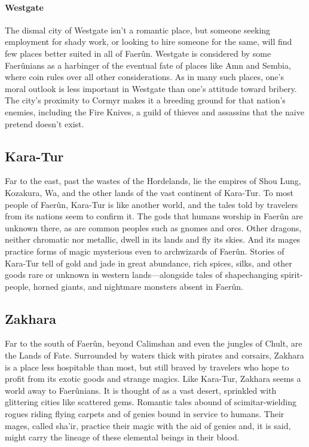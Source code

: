 \documentclass[10pt,a4paper,twoside,twocolumn,openany,bg=print,nodeprecatedcode]{dndbook}
\begin{document}
\paragraph{Westgate}
The dismal city of Westgate isn't a romantic place, but someone seeking employment for shady work, or looking to hire someone for the same, will find few places better suited in all of Faerûn.
Westgate is considered by some Faerûnians as a harbinger of the eventual fate of places like Amn and Sembia, where coin rules over all other considerations. As in many such places, one's moral outlook is less important in Westgate than one's attitude toward bribery. The city's proximity to Cormyr makes it a breeding ground for that nation's enemies, including the Fire Knives, a guild of thieves and assassins that the naive pretend doesn't exist.
\subsection{Kara-Tur}
Far to the east, past the wastes of the Hordelands, lie the empires of Shou Lung, Kozakura, Wa, and the other lands of the vast continent of Kara-Tur. To most people of Faerûn, Kara-Tur is like another world, and the tales told by travelers from its nations seem to confirm it. The gods that humans worship in Faerûn are unknown there, as are common peoples such as gnomes and orcs. Other dragons, neither chromatic nor metallic, dwell in its lands and fly its skies. And its mages practice forms of magic mysterious even to archwizards of Faerûn.
Stories of Kara-Tur tell of gold and jade in great abundance, rich spices, silks, and other goods rare or unknown in western lands—alongside tales of shapechanging spirit-people, horned giants, and nightmare monsters absent in Faerûn.
\subsection{Zakhara}
Far to the south of Faerûn, beyond Calimshan and even the jungles of Chult, are the Lands of Fate. Surrounded by waters thick with pirates and corsairs, Zakhara is a place less hospitable than most, but still braved by travelers who hope to profit from its exotic goods and strange magics. Like Kara-Tur, Zakhara seems a world away to Faerûnians. It is thought of as a vast desert, sprinkled with glittering cities like scattered gems. Romantic tales abound of scimitar-wielding rogues riding flying carpets and of genies bound in service to humans. Their mages, called sha'ir, practice their magic with the aid of genies and, it is said, might carry the lineage of these elemental beings in their blood.
\end{document}
